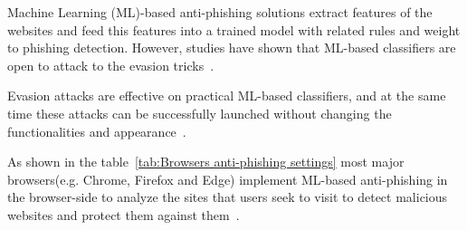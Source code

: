 Machine Learning (ML)-based anti-phishing solutions extract features of the websites and feed this features into a trained model with related rules and weight to phishing detection. However, studies have shown that ML-based classifiers are open to attack to the evasion tricks~\cite{lei2020advanced,laskov2014practical,chen2018automated,xuposter,hu2017black,anderson2019adversarial,aleroud2020bypassing,sabir2020evasion}. 

Evasion attacks are effective on practical ML-based classifiers, and at the same time these attacks can be successfully launched without changing the functionalities and appearance~\cite{lei2020advanced}.

As shown in the table~\ref{tab:Browsers anti-phishing settings} most major browsers(e.g. Chrome, Firefox and Edge) implement ML-based anti-phishing in the browser-side to analyze the sites that users seek to visit to detect malicious websites and protect them against them~\cite{mjcaparas,whittaker2010large}.



